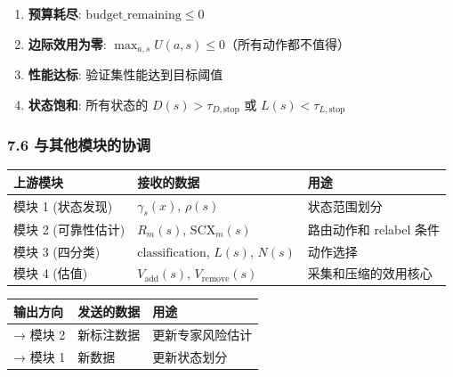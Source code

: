 \documentclass[
  12pt,
]{ctexart}
\providecommand{\tightlist}{%
  \setlength{\itemsep}{0pt}\setlength{\parskip}{0pt}}
\begin{document}
\begin{enumerate}
\def\labelenumi{\arabic{enumi}.}
\tightlist
\item
  \textbf{预算耗尽}: \(\text{budget\_remaining} \leq 0\)
\item
  \textbf{边际效用为零}:
  \(\max_{a,s} U(a,s) \leq 0\)（所有动作都不值得）
\item
  \textbf{性能达标}: 验证集性能达到目标阈值
\item
  \textbf{状态饱和}: 所有状态的 \(D(s) > \tau_{D,\text{stop}}\) 或
  \(L(s) < \tau_{L,\text{stop}}\)
\end{enumerate}

\subsubsection{7.6
与其他模块的协调}\label{ux4e0eux5176ux4ed6ux6a21ux5757ux7684ux534fux8c03-6}

\begin{longtable}[]{@{}
  >{\raggedright\arraybackslash}p{}
  >{\raggedright\arraybackslash}p{}
  >{\raggedright\arraybackslash}p{}@{}}
\toprule\noalign{}
\begin{minipage}[b]{\linewidth}\raggedright
上游模块
\end{minipage} & \begin{minipage}[b]{\linewidth}\raggedright
接收的数据
\end{minipage} & \begin{minipage}[b]{\linewidth}\raggedright
用途
\end{minipage} \\
\midrule\noalign{}
\endhead
\bottomrule\noalign{}
\endlastfoot
模块 1 (状态发现) & \(\gamma_s(x)\), \(\rho(s)\) & 状态范围划分 \\
模块 2 (可靠性估计) & \(R_m(s)\), \(\text{SCX}_m(s)\) & 路由动作和
relabel 条件 \\
模块 3 (四分类) & \(\text{classification}\), \(L(s)\), \(N(s)\) &
动作选择 \\
模块 4 (估值) & \(V_{\text{add}}(s)\), \(V_{\text{remove}}(s)\) &
采集和压缩的效用核心 \\
\end{longtable}

\begin{longtable}[]{@{}lll@{}}
\toprule\noalign{}
输出方向 & 发送的数据 & 用途 \\
\midrule\noalign{}
\endhead
\bottomrule\noalign{}
\endlastfoot
→ 模块 2 & 新标注数据 & 更新专家风险估计 \\
→ 模块 1 & 新数据 & 更新状态划分 \\
\end{longtable}
\end{document}
